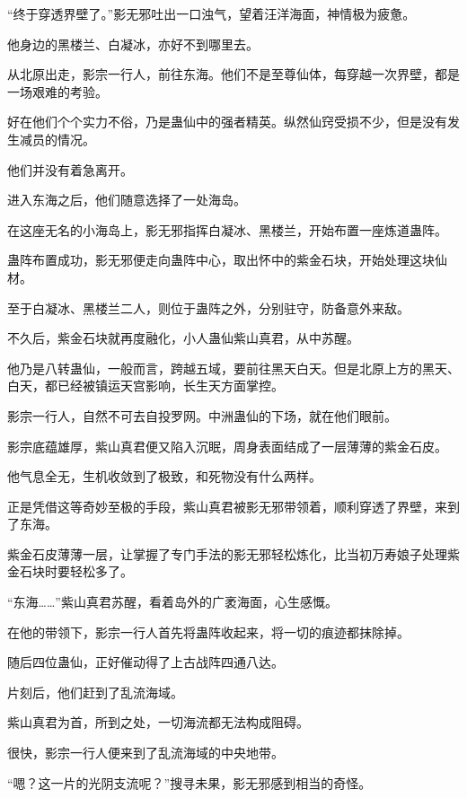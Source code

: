 
\begin{this_body}

“终于穿透界壁了。”影无邪吐出一口浊气，望着汪洋海面，神情极为疲惫。

他身边的黑楼兰、白凝冰，亦好不到哪里去。

从北原出走，影宗一行人，前往东海。他们不是至尊仙体，每穿越一次界壁，都是一场艰难的考验。

好在他们个个实力不俗，乃是蛊仙中的强者精英。纵然仙窍受损不少，但是没有发生减员的情况。

他们并没有着急离开。

进入东海之后，他们随意选择了一处海岛。

在这座无名的小海岛上，影无邪指挥白凝冰、黑楼兰，开始布置一座炼道蛊阵。

蛊阵布置成功，影无邪便走向蛊阵中心，取出怀中的紫金石块，开始处理这块仙材。

至于白凝冰、黑楼兰二人，则位于蛊阵之外，分别驻守，防备意外来敌。

不久后，紫金石块就再度融化，小人蛊仙紫山真君，从中苏醒。

他乃是八转蛊仙，一般而言，跨越五域，要前往黑天白天。但是北原上方的黑天、白天，都已经被镇运天宫影响，长生天方面掌控。

影宗一行人，自然不可去自投罗网。中洲蛊仙的下场，就在他们眼前。

影宗底蕴雄厚，紫山真君便又陷入沉眠，周身表面结成了一层薄薄的紫金石皮。

他气息全无，生机收敛到了极致，和死物没有什么两样。

正是凭借这等奇妙至极的手段，紫山真君被影无邪带领着，顺利穿透了界壁，来到了东海。

紫金石皮薄薄一层，让掌握了专门手法的影无邪轻松炼化，比当初万寿娘子处理紫金石块时要轻松多了。

“东海……”紫山真君苏醒，看着岛外的广袤海面，心生感慨。

在他的带领下，影宗一行人首先将蛊阵收起来，将一切的痕迹都抹除掉。

随后四位蛊仙，正好催动得了上古战阵四通八达。

片刻后，他们赶到了乱流海域。

紫山真君为首，所到之处，一切海流都无法构成阻碍。

很快，影宗一行人便来到了乱流海域的中央地带。

“嗯？这一片的光阴支流呢？”搜寻未果，影无邪感到相当的奇怪。


\end{this_body}

